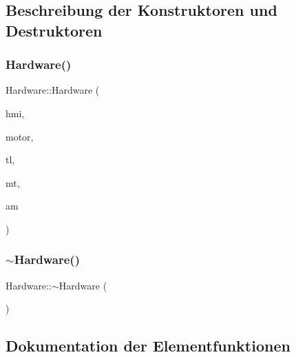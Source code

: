 \subsection{Beschreibung der Konstruktoren und Destruktoren}
\hypertarget{class_hardware_aeda7f2e883005df9488865d9b1ea1994}{}\label{class_hardware_aeda7f2e883005df9488865d9b1ea1994} 
\subsubsection{\texorpdfstring{Hardware()}{Hardware()}}
{\footnotesize\ttfamily Hardware\+::\+Hardware (\begin{DoxyParamCaption}\item[{\hyperlink{class_human_machine_interface}{Human\+Machine\+Interface} $\ast$}]{hmi,  }\item[{\hyperlink{class_motor}{Motor} $\ast$}]{motor,  }\item[{\hyperlink{class_traffic_light}{Traffic\+Light} $\ast$}]{tl,  }\item[{\hyperlink{class_measuring_tool}{Measuring\+Tool} $\ast$}]{mt,  }\item[{\hyperlink{class_altimetry}{Altimetry} $\ast$}]{am }\end{DoxyParamCaption})}

\hypertarget{class_hardware_a92901a44130552d28485409bcf6906f5}{}\label{class_hardware_a92901a44130552d28485409bcf6906f5} 
\subsubsection{\texorpdfstring{$\sim$\+Hardware()}{~Hardware()}}
{\footnotesize\ttfamily Hardware\+::$\sim$\+Hardware (\begin{DoxyParamCaption}{ }\end{DoxyParamCaption})}



\subsection{Dokumentation der Elementfunktionen}
\hypertarget{class_hardware_afa1aaabe0d2433e35e6efd735fa15daf}{}\label{class_hardware_afa1aaabe0d2433e35e6efd735fa15daf} 
